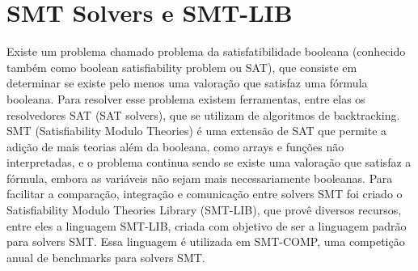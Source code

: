 \section{SMT Solvers e SMT-LIB}\label{sec:LABEL_CHP_2_SEC_B}
Existe um problema chamado problema da satisfatibilidade booleana (conhecido também como boolean satisfiability problem ou SAT), que consiste em determinar se existe pelo menos uma valoração que satisfaz uma fórmula booleana. Para resolver esse problema existem ferramentas, entre elas os resolvedores SAT (SAT solvers), que se utilizam de algoritmos de backtracking. SMT (Satisfiability Modulo Theories) é uma extensão de SAT que permite a adição de mais teorias além da booleana, como arrays e funções não interpretadas, e o problema continua sendo se existe uma valoração que satisfaz a fórmula, embora as variáveis não sejam mais necessariamente booleanas. Para facilitar a comparação, integração e comunicação entre solvers SMT foi criado o Satisfiability Modulo Theories Library (SMT-LIB), que provê diversos recursos, entre eles a linguagem SMT-LIB, criada com objetivo de ser a linguagem padrão para solvers SMT. Essa linguagem é utilizada em SMT-COMP, uma competição anual de benchmarks para solvers SMT.


